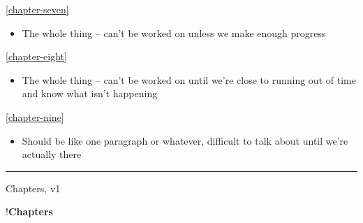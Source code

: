 \autoref{chapter-seven}

\begin{itemize}
\tightlist
\item
  The whole thing -- can't be worked on unless we make enough progress
\end{itemize}

\autoref{chapter-eight}

\begin{itemize}
\tightlist
\item
  The whole thing -- can't be worked on until we're close to running out
  of time and know what isn't happening
\end{itemize}

\autoref{chapter-nine}

\begin{itemize}
\tightlist
\item
  Should be like one paragraph or whatever, difficult to talk about
  until we're actually there
\end{itemize}

\begin{center}\rule{0.5\linewidth}{0.5pt}\end{center}

Chapters, v1

!\textbf{Chapters}

